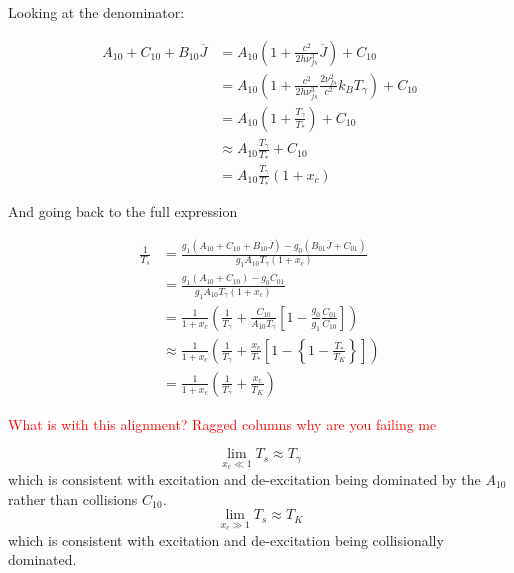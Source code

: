 \begin{enumerate}
{	Looking at the denominator:

	\begin{align*}
	    A_{10} + C_{10} + B_{10}\overline{J} &= A_{10}\left(1 + \frac{c^2}{2h\nu_{fs}^3}\overline{J}\right) + C_{10}\\
	        &= A_{10}\left(1 + \frac{c^2}{2h\nu_{fs}^3}\frac{2\nu_{fs}^2}{c^2}k_BT_\gamma\right) + C_{10}\\
	        &= A_{10}\left(1 + \frac{T_\gamma}{T_*}\right) + C_{10}\\
	        &\approx A_{10}\frac{T_\gamma}{T_*} + C_{10}\\
	        &= A_{10}\frac{T_\gamma}{T_*}\left(1 + x_c\right)
	\end{align*}

	And going back to the full expression

	\begin{align*}
	    \frac{1}{T_s} &= \frac{g_1(A_{10} + C_{10} + B_{10}\overline{J}) - g_0(B_{01}\overline{J} + C_{01})}{g_1A_{10}T_\gamma(1+x_c)}\\
	        &= \frac{g_1(A_{10} + C_{10}) - g_0C_{01}}{g_1A_{10}T_\gamma(1+x_c)}\\
	        &= \frac{1}{1+x_c}\left(\frac{1}{T_\gamma} + \frac{C_{10}}{A_{10}T_\gamma}\left[1 - \frac{g_0}{g_1}\frac{C_{01}}{C_{10}}\right]\right)\\
	        &\approx \frac{1}{1+x_c}\left(\frac{1}{T_\gamma} + \frac{x_c}{T_*}\left[1-\left\{1 - \frac{T_*}{T_K}\right\}\right]\right)\\
	        &= \frac{1}{1+x_c}\left(\frac{1}{T_\gamma} + \frac{x_c}{T_K}\right)
	\end{align*}

	\textcolor{red}{What is with this alignment? Ragged columns why are you failing me}
	\begin{multicols}{2}
		\raggedcolumns
		$$\lim_{x_c \ll 1}T_s \approx T_\gamma$$
		which is consistent with excitation and de-excitation being dominated by the $A_{10}$ rather than collisions $C_{10}$.
		\columnbreak\vfill
		$$\lim_{x_c \gg 1}T_s \approx T_K$$
		which is consistent with excitation and de-excitation being collisionally dominated.
	\end{multicols}}


\end{enumerate}
